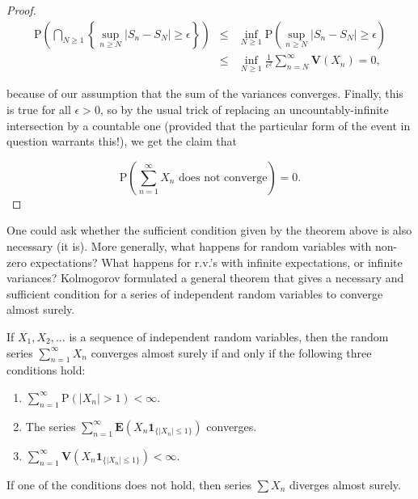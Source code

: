 \begin{proof}
\begin{eqnarray*}
\mathrm{P}\left( \bigcap_{N\ge 1} \left\{
\sup_{n\ge N}
|S_n-S_N|\ge\epsilon
\right\} \right) &\le& \inf_{N\ge 1}
\mathrm{P}\left(
\sup_{n\ge N}
|S_n-S_N|\ge\epsilon
\right) \\ &\le&
\inf_{N\ge 1} \frac{1}{\epsilon^2} \sum_{n=N}^\infty \mathbf{V}(X_n) = 0,
\end{eqnarray*}

\noindent because of our assumption that the sum of the
variances converges. Finally, this is true for all
$\epsilon>0$, so by the usual trick of replacing an
uncountably-infinite intersection by a countable one
(provided that the particular form of the event in
question warrants this!), we get the claim that

\[
\mathrm{P}\left(\sum_{n=1}^\infty X_n\textrm{ does not converge}\right) = 0.
\]

\end{proof}

\noindent One could ask whether the sufficient condition given
by the theorem above is also necessary (it is). More
generally, what happens for random variables with
non-zero expectations? What happens for r.v.'s with
infinite expectations, or infinite variances?
Kolmogorov formulated a general theorem that gives a
necessary and sufficient condition for a series of
independent random variables to converge almost
surely.

\begin{thm}
\label{thm-three-series}
If $X_1,X_2,\ldots$ is a sequence of independent
random variables, then the random series
$\sum_{n=1}^\infty X_n$ converges almost surely if
and only if the following three conditions hold:

\begin{enumerate}[label=\arabic*.]
\item $\sum_{n=1}^\infty \mathrm{P}(|X_n|>1) < \infty$.

\item The series
$\sum_{n=1}^\infty \mathbf{E}(X_n
\mathbf{1}_{\{|X_n|\le 1\}})$
converges.

\item $\sum_{n=1}^\infty \mathbf{V}(X_n \mathbf{1}_{\{|X_n|
\le 1\}}) < \infty$.
\end{enumerate}

\noindent If one of the conditions does not hold, then series
$\sum X_n$ diverges almost surely.
\end{thm}

